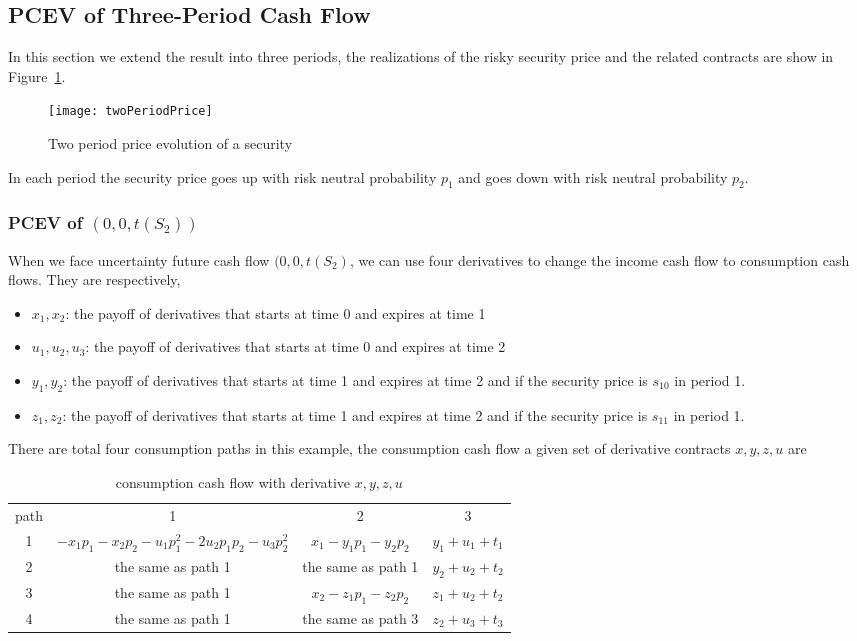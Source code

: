 \subsection{PCEV of Three-Period Cash Flow}
In this section we extend the result into three periods, the realizations of the  risky security price and the related contracts are show in Figure~\ref{fig:twoPeriodPrice}. 

\begin{figure}
\texttt{[image: twoPeriodPrice]}\newline
\caption{Two period price evolution of a security}%
\label{fig:twoPeriodPrice}%
\end{figure}
In each period the security price goes up with risk neutral probability $p_1$ and goes down with risk neutral probability $p_2$.

\subsubsection{PCEV of $(0,0,t(S_2))$}


When we face uncertainty future cash flow $(0,0,t(S_2)$, we can use four derivatives to change the income cash flow to consumption cash flows. They are respectively,
\begin{itemize}
\item $x_1, x_2$: the payoff of derivatives that starts at time 0 and expires at time 1
\item $u_1, u_2, u_3$: the payoff of derivatives that starts at time 0 and expires at time 2
\item $y_1, y_2$: the payoff of derivatives that starts at time 1 and expires at time 2 and if the security price is $s_{10}$ in period 1.
\item $z_1, z_2$: the payoff of derivatives that starts at time 1 and expires at time 2 and if the security price is $s_{11}$ in period 1.
\end{itemize}




There are total four consumption paths in this example, the consumption cash flow  a given set of derivative contracts $x, y, z, u$ are
\begin{table}[htdp]
\begin{center}\begin{tabular}{cccc} path & 1 & 2 & 3 \\ 1 &$-x_1p_1 - x_2p_2 - u_1p_1^2 -2u_2p_1p_2 - u_3p^2_2$ & $x_1 - y_1p_1 - y_2 p_2$ & $y_1 + u_1 + t_1$ \\2& the same as path 1 & the same as path 1 & $y_2 + u_2 + t_2$ \\3 & the same as path 1 & $x_2  - z_1 p_1-z_2p_2$ & $z_1 + u_2 + t_2$ \\4 & the same as path 1 & the same as path 3 & $z_2 + u_3 + t_3$ \end{tabular} \caption{consumption cash flow with derivative $x,y,z, u$}
\end{center}
\label{defaulttable}
\end{table}

